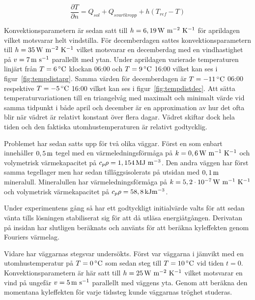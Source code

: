 \begin{equation}
\label{eq:wallneumann}
\frac{\partial T}{\partial n} = Q_{sol} + Q_{svartkropp} + h(T_{ref}-T)
\end{equation}

Konvektionsparametern är sedan satt till $h=\unit[6,19]{W~m^{-2}~K^{-1}}$ för aprildagen vilket motsvarar helt vindstilla.
För decemberdagen sattes konvektionsparametern till $h=\unit[35]{W~m^{-2}~K^{-1}}$ vilket motsvarar en decemberdag med en vindhastighet på $v=\unit[7]{m~s^{-1}}$ parallellt
med ytan.
Under aprildagen varierade temperaturen linjärt från $T=\unit[6]{^\circ C}$ klockan 06:00 och $T=\unit[9]{^\circ C}$ 16:00 vilket kan ses i figur~\ref{fig:tempdistapr}.
Samma värden för decemberdagen är $T = \unit[-11]{^\circ C}$ 06:00 respektive $T=\unit[-5]{^\circ C}$ 16:00 vilket kan ses i figur~\ref{fig:tempdistdec}. Att sätta temperaturvariationen till en triangelvåg med maximalt och minimalt värde vid samma tidpunkt i både april och december är en approximation av hur det ofta blir när vädret är relativt konstant över flera dagar. Vädret skiftar dock hela tiden och den faktiska utomhustemperaturen är relativt godtycklig.

Problemet har sedan satts upp för två olika väggar. Först en som enbart innehåller $\unit[0,5]{m}$ tegel med
en värmeledningsförmåga på $k = \unit[0,6]{W~m^{-1}~K^{-1}}$ och volymetrisk värmekapacitet på
$c_{p}\rho = \unit[1,154]{MJ~m^{-3}}$. Den andra väggen har först samma tegellager men
har sedan tilläggsisolerats på utsidan med $\unit[0,1]{m}$ mineralull. Mineralullen har värmeledningsförmåga på
$k = \unit[5,2\cdot 10^{-7}]{W~m^{-1}~K^{-1}}$ och volymetrisk värmekapacitet på
$c_{p}\rho = \unit[58,8]{kJ m^{-3}}$. \cite{kandidatarbete2010}\cite{engineeringtoolboxdensity}\cite{bkvthermal}\cite{engineeringtoolboxspecificheat}

Under experimentens gång så har ett godtyckligt initialvärde valts för att sedan vänta tills
lösningen stabiliserat sig för att då utläsa energiåtgången. Derivatan på insidan har slutligen beräknats
och använts för att beräkna kyleffekten genom Fouriers värmelag.

Vidare har väggarnas stegsvar undersökts. Först var väggarna i jämvikt med en utomhustemperatur på $T = \unit[0]{^\circ C}$ som sedan steg till $T = \unit[10]{^\circ C}$ vid tiden $t=0$. Konvektionsparametern är här satt till
$h = \unit[25]{W~m^{-2}~K^{-1}}$ vilket motsvarar en vind på ungefär 
$v = \unit[5]{m~s^{-1}}$ parallellt med väggens yta. Genom att beräkna den momentana kyleffekten för varje tidssteg kunde väggarnas tröghet studeras.

